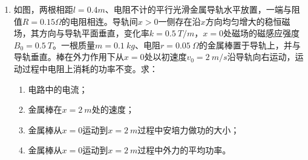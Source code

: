 \begin{enumerate}
\begin{enumerate}
\end{enumerate}
\begin{figure}[h!]
\flushright

\end{figure}




\item
{}
如图，两根相距$ l=0.4m $、电阻不计的平行光滑金属导轨水平放置，一端与阻值$ R=0.15 \Omega $的电阻相连。导轨间$ x > 0 $一侧存在沿$ x $方向均匀增大的稳恒磁场，其方向与导轨平面垂直，变化率$ k=0.5 \ T/m $，$ x=0 $处磁场的磁感应强度$ B_0=0.5 \ T $。一根质量$ m=0.1 \ kg $、电阻$ r=0.05\ \Omega $的金属棒置于导轨上，并与导轨垂直。棒在外力作用下从$ x=0 $处以初速度$ v_0=2 \ m/s $沿导轨向右运动，运动过程中电阻上消耗的功率不变。求：
\begin{enumerate}
\renewcommand{\labelenumi}{\arabic{enumi}.}
\item
电路中的电流；
\item 
金属棒在$ x=2\ m $处的速度；
\item 
金属棒从$ x=0 $运动到$ x=2\ m $过程中安培力做功的大小；
\item 
金属棒从$ x=0 $运动到$ x=2\ m $过程中外力的平均功率。

\end{enumerate}
\begin{figure}[h!]
\flushright

\end{figure}



\end{enumerate}
